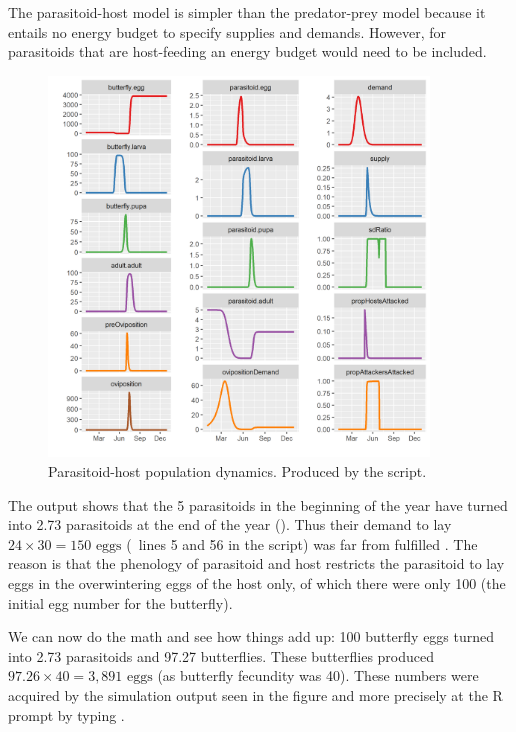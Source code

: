 The parasitoid-host model is simpler than the predator-prey model because it entails no energy budget to specify supplies and demands. However, for parasitoids that are host-feeding an energy budget would need to be included.

\begin{figure} [h]
\centering
\includegraphics[width=0.9\textwidth]{graphics/func-resp-para-host}
\caption{Parasitoid-host population dynamics. Produced by the  script.}
\label{fig:func-resp-para-host}
\end{figure}

The output shows that the 5 parasitoids in the beginning of the year have turned into 2.73 parasitoids at the end of the year (). Thus their demand to lay $24\times 30=150 \text{ eggs}$ (\cf\ lines 5 and 56 in the script) was far from fulfilled . The reason is that the phenology of parasitoid and host restricts the parasitoid to lay eggs in the overwintering eggs of the host only, of which there were only 100 (the initial egg number for the butterfly).

We can now do the math and see how things add up: 100 butterfly eggs turned into 2.73 parasitoids and 97.27 butterflies. These butterflies produced $97.26\times 40=3,891 \text{ eggs}$ (as butterfly fecundity was 40). These numbers were acquired by the simulation output seen in the figure and more precisely at the R prompt by typing .


